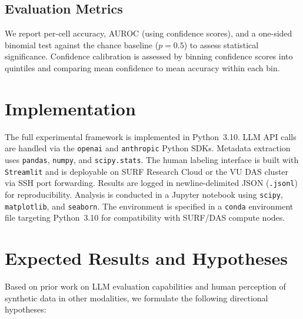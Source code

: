 \documentclass[runningheads]{llncs}
\begin{document}
\subsection{Evaluation Metrics}

We report per-cell accuracy, AUROC (using confidence scores), and a
one-sided binomial test against the chance baseline ($p = 0.5$) to
assess statistical significance.
Confidence calibration is assessed by binning confidence scores into
quintiles and comparing mean confidence to mean accuracy within each
bin.

\section{Implementation}
\label{sec:impl}

The full experimental framework is implemented in Python~3.10.
LLM API calls are handled via the \texttt{openai} and
\texttt{anthropic} Python SDKs.
Metadata extraction uses \texttt{pandas}, \texttt{numpy}, and
\texttt{scipy.stats}.
The human labeling interface is built with \texttt{Streamlit} and is
deployable on SURF Research Cloud or the VU DAS cluster via SSH port
forwarding.
Results are logged in newline-delimited JSON (\texttt{.jsonl}) for
reproducibility.
Analysis is conducted in a Jupyter notebook using \texttt{scipy},
\texttt{matplotlib}, and \texttt{seaborn}.
The environment is specified in a \texttt{conda} environment file
targeting Python~3.10 for compatibility with SURF/DAS compute nodes.

\section{Expected Results and Hypotheses}
\label{sec:hypotheses}

Based on prior work on LLM evaluation capabilities and human perception
of synthetic data in other modalities, we formulate the following
directional hypotheses:
\end{document}
